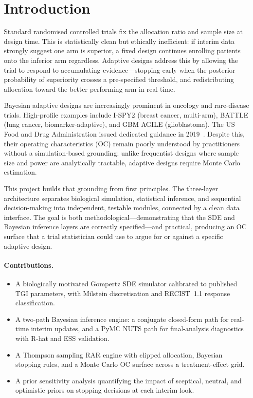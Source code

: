 \documentclass[11pt,a4paper]{article}
\begin{document}
\section{Introduction}
 
Standard randomised controlled trials fix the allocation ratio and sample size
at design time. This is statistically clean but ethically inefficient: if
interim data strongly suggest one arm is superior, a fixed design continues
enrolling patients onto the inferior arm regardless. Adaptive designs address
this by allowing the trial to respond to accumulating evidence---stopping early
when the posterior probability of superiority crosses a pre-specified threshold,
and redistributing allocation toward the better-performing arm in real time.
 
Bayesian adaptive designs are increasingly prominent in oncology and rare-disease
trials. High-profile examples include I-SPY2 (breast cancer, multi-arm),
BATTLE (lung cancer, biomarker-adaptive), and GBM AGILE (glioblastoma). The
US Food and Drug Administration issued dedicated guidance in 2019~\cite{FDA2019}.
Despite this, their operating characteristics (OC) remain poorly understood by
practitioners without a simulation-based grounding: unlike frequentist designs
where sample size and power are analytically tractable, adaptive designs require
Monte Carlo estimation.
 
This project builds that grounding from first principles. The three-layer
architecture separates biological simulation, statistical inference, and
sequential decision-making into independent, testable modules, connected by a
clean data interface. The goal is both methodological---demonstrating that the
SDE and Bayesian inference layers are correctly specified---and practical,
producing an OC surface that a trial statistician could use to argue for or
against a specific adaptive design.
 
\paragraph{Contributions.}
\begin{itemize}
  \item A biologically motivated Gompertz SDE simulator calibrated to published
        TGI parameters, with Milstein discretisation and RECIST~1.1 response
        classification.
  \item A two-path Bayesian inference engine: a conjugate closed-form path for
        real-time interim updates, and a PyMC NUTS path for final-analysis
        diagnostics with R-hat and ESS validation.
  \item A Thompson sampling RAR engine with clipped allocation, Bayesian
        stopping rules, and a Monte Carlo OC surface across a treatment-effect
        grid.
  \item A prior sensitivity analysis quantifying the impact of sceptical,
        neutral, and optimistic priors on stopping decisions at each interim look.
\end{itemize}
 
\end{document}
